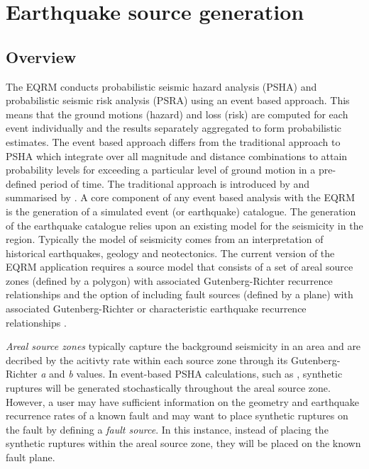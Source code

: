 \chapter{Earthquake source generation}
\label{ch:source}

\section{Overview}

The EQRM conducts probabilistic seismic hazard analysis (PSHA) and
probabilistic seismic risk analysis (PSRA) using an event based
approach. This means that the ground motions (hazard) and loss
(risk) are computed for each event individually and the results
separately aggregated to form probabilistic estimates. The event
based approach differs from the traditional approach to PSHA which
integrate over all magnitude and distance combinations to attain
probability levels for exceeding a particular level of ground
motion in a pre-defined period of time. The traditional approach
is introduced by \citet{dr_Cornell68a} and summarised by
\citet{dr_McGuire90a}. A core component of any event based
analysis with the EQRM is the generation of a simulated
event (or earthquake) catalogue. The
generation of the earthquake catalogue relies upon an existing model for
the seismicity in the region. Typically the  model of seismicity comes
 from an interpretation of historical earthquakes,
 geology and neotectonics. The current version of the EQRM application requires a source model
that consists of a set of areal source zones (defined by a polygon) with associated
Gutenberg-Richter recurrence relationships and the option of including fault sources (defined by a plane) with associated 
Gutenberg-Richter or characteristic earthquake recurrence relationships \citet{eqrm_Schwartz84}. 

\emph{Areal source zones} typically capture the background seismicity in an area and are decribed by the acitivty rate within
each source zone through its Gutenberg-Richter \emph{a} and \emph{b} values. In event-based PSHA calculations, such as ,
synthetic ruptures will be generated stochastically throughout the areal source zone. However, a user may have sufficient information 
on the geometry and earthquake recurrence rates of a known fault and may want to place synthetic ruptures on the fault by defining a 
\emph{fault source}. In this instance, instead of placing the synthetic ruptures within the areal source zone, they will be placed 
on the known fault plane. \\

